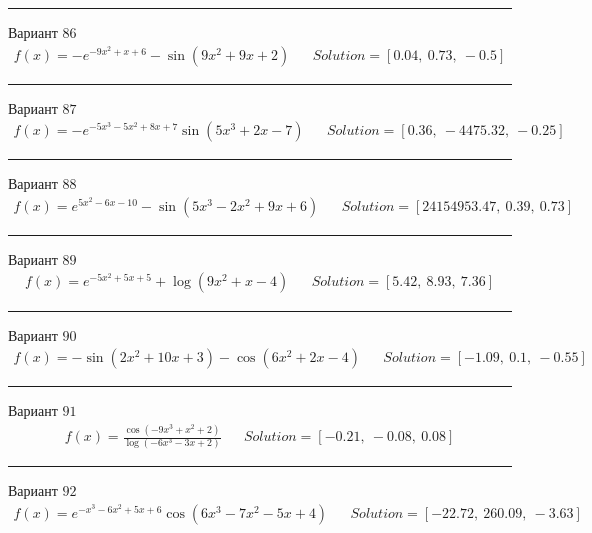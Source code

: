 \documentclass[11pt]{report}
\begin{document}
\begin{center}
    \noindent\rule{8cm}{0.4pt}
\end{center}
Вариант \(86\)
\begin{align*}
    f(x) = - e^{- 9 x^{2} + x + 6} - \sin{\left(9 x^{2} + 9 x + 2 \right)} && Solution = \left[ 0.04, \  0.73, \  -0.5\right]
\end{align*}
\begin{center}
    \noindent\rule{8cm}{0.4pt}
\end{center}
Вариант \(87\)
\begin{align*}
    f(x) = - e^{- 5 x^{3} - 5 x^{2} + 8 x + 7} \sin{\left(5 x^{3} + 2 x - 7 \right)} && Solution = \left[ 0.36, \  -4475.32, \  -0.25\right]
\end{align*}
\begin{center}
    \noindent\rule{8cm}{0.4pt}
\end{center}
Вариант \(88\)
\begin{align*}
    f(x) = e^{5 x^{2} - 6 x - 10} - \sin{\left(5 x^{3} - 2 x^{2} + 9 x + 6 \right)} && Solution = \left[ 24154953.47, \  0.39, \  0.73\right]
\end{align*}
\begin{center}
    \noindent\rule{8cm}{0.4pt}
\end{center}
Вариант \(89\)
\begin{align*}
    f(x) = e^{- 5 x^{2} + 5 x + 5} + \log{\left(9 x^{2} + x - 4 \right)} && Solution = \left[ 5.42, \  8.93, \  7.36\right]
\end{align*}
\begin{center}
    \noindent\rule{8cm}{0.4pt}
\end{center}
Вариант \(90\)
\begin{align*}
    f(x) = - \sin{\left(2 x^{2} + 10 x + 3 \right)} - \cos{\left(6 x^{2} + 2 x - 4 \right)} && Solution = \left[ -1.09, \  0.1, \  -0.55\right]
\end{align*}
\begin{center}
    \noindent\rule{8cm}{0.4pt}
\end{center}
Вариант \(91\)
\begin{align*}
    f(x) = \frac{\cos{\left(- 9 x^{3} + x^{2} + 2 \right)}}{\log{\left(- 6 x^{3} - 3 x + 2 \right)}} && Solution = \left[ -0.21, \  -0.08, \  0.08\right]
\end{align*}
\begin{center}
    \noindent\rule{8cm}{0.4pt}
\end{center}
Вариант \(92\)
\begin{align*}
    f(x) = e^{- x^{3} - 6 x^{2} + 5 x + 6} \cos{\left(6 x^{3} - 7 x^{2} - 5 x + 4 \right)} && Solution = \left[ -22.72, \  260.09, \  -3.63\right]
\end{align*}
\end{document}
